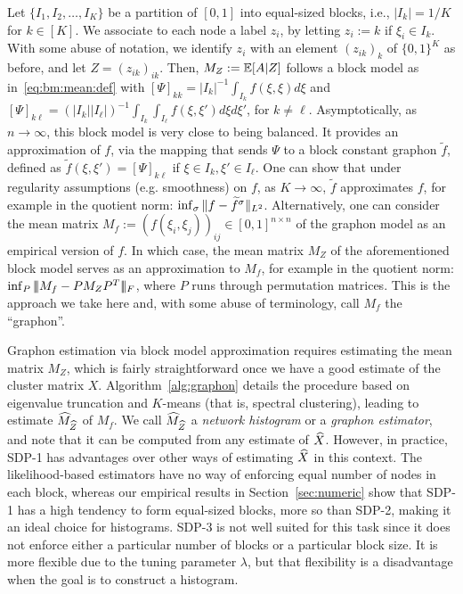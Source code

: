 \newcommand{\ft}{\widetilde{f}}
 Let $\{I_1,I_2,\dots,I_K\}$ be a partition of $[0,1]$ into equal-sized blocks, i.e., $|I_k| = 1/K$ for $k \in [K]$. We associate to each node a label $z_i$, by letting $z_i := k$ if $\xi_i \in I_k$. With some abuse of notation, we identify $z_i$ with an element $(z_{ik})_k$ of $\{0,1\}^K$ as before, and let $Z = (z_{ik})_{ik}$. Then, $M_Z := \mathbb{E}[A|Z]$ follows a block model as in~\eqref{eq:bm:mean:def} with $[\Psi]_{kk} = |I_k|^{-1} \int_{I_k} f(\xi,\xi) d\xi$ and $[\Psi]_{k \ell} = (|I_k||I_\ell|)^{-1}\int_{I_k} \int_{I_\ell} f(\xi,\xi') d\xi d\xi'$, for $k \neq \ell$. Asymptotically, as $n \to \infty$, this block model is very close to being balanced. It provides an approximation of $f$, via the mapping that sends $\Psi$ to a block constant graphon $\ft$, defined as $\ft(\xi,\xi') = [\Psi]_{k \ell}$ if $\xi \in I_k, \xi' \in I_\ell$. One can show that under regularity assumptions (e.g. smoothness) on $f$, as $K \to \infty$, $\ft$ approximates $f$, for example in the quotient norm: $\inf_\sigma \vnorm{f - \ft^{\sigma}}_{L^2}$. Alternatively, one can consider the mean matrix $M_f := (f(\xi_i,\xi_j))_{ij} \in [0,1]^{n \times n}$ of the graphon model as an empirical version of $f$. In which case, the mean matrix $M_Z$ of the aforementioned block model serves as an approximation to $M_f$, for example in the quotient norm: $\inf_{P} |\!|\!|M_f - P M_Z P^T|\!|\!|_F$, where $P$ runs through permutation matrices. This is the approach we take here and, with some abuse of terminology, call $M_f$ the ``graphon''.

  Graphon estimation via block model approximation requires estimating the mean matrix $M_Z$, which is fairly straightforward once we have a good estimate of the cluster matrix $X$. Algorithm~\ref{alg:graphon} details the procedure based on eigenvalue truncation and $K$-means (that is, spectral clustering), leading to estimate $\widehat{M}_{\widehat{Z}}$ of $M_f$. We call $\widehat{M}_{\widehat{Z}}$ a \emph{network histogram} or a \emph{graphon estimator}, and note that it can be computed from any estimate 
  of $\widehat{X}$. However, in practice, SDP-1 has advantages over other ways of estimating $\widehat{X}$ in this context.  The likelihood-based estimators have no way of enforcing equal number of nodes in each block, whereas our empirical results in Section~\ref{sec:numeric} show that SDP-1 has a high tendency to form equal-sized blocks, more so than SDP-2, making it an ideal choice for histograms.  SDP-3 is not well suited for this task since it does not enforce either a particular number of blocks or a particular block size.  
It is more flexible due to the tuning parameter $\lambda$, but that flexibility is a disadvantage when the goal is to construct a histogram.

